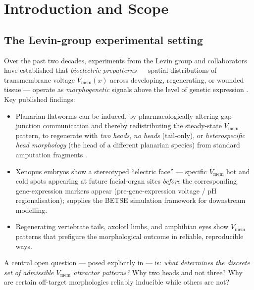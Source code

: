 \documentclass[12pt]{article}
\begin{document}
\begin{abstract}
\textbf{Status.} The spectral-structure and group-action
content is sim-verified. The identification of specific
morphological phenotypes with specific low-mode labels is
\emph{conjectural} and awaits the B\_modes\_full full-character-
projection build plus empirical comparison against curated
Levin-group regeneration outcomes. Every step is classified
as \textbf{derived} (proved / sim-verified), \textbf{identified}
(structural correspondence), or \textbf{open / conjectural}.
\end{abstract}

\section{Introduction and Scope}\label{sec:intro}

\subsection{The Levin-group experimental setting}

Over the past two decades, experiments from the Levin group and
collaborators have established that \emph{bioelectric
prepatterns} --- spatial distributions of transmembrane voltage
$V_{\mathrm{mem}}(x)$ across developing, regenerating, or
wounded tissue --- operate as \emph{morphogenetic} signals above
the level of genetic expression
\cite{LevinBeane2011,DurantLevin2017,PietakLevin2016,Levin2021}.
Key published findings:
\begin{itemize}
\item Planarian flatworms can be induced, by pharmacologically
  altering gap-junction communication and thereby redistributing
  the steady-state $V_{\mathrm{mem}}$ pattern, to regenerate with
  \emph{two heads}, \emph{no heads} (tail-only), or
  \emph{heterospecific head morphology} (the head of a different
  planarian species) from standard amputation fragments
  \cite{LevinBeane2011,EmmonsBell2015,DurantLevin2017}.
\item Xenopus embryos show a stereotyped ``electric face'' ---
  specific $V_{\mathrm{mem}}$ hot and cold spots appearing at
  future facial-organ sites \emph{before} the corresponding
  gene-expression markers appear \cite{VandenbergLevin2011}
  (pre-gene-expression voltage / pH regionalisation);
  \cite{PietakLevin2016} supplies the BETSE simulation framework
  for downstream modelling.
\item Regenerating vertebrate tails, axolotl limbs, and
  amphibian eyes show $V_{\mathrm{mem}}$ patterns that prefigure
  the morphological outcome in reliable, reproducible ways.
\end{itemize}
A central open question --- posed explicitly in
\cite{Levin2021} --- is: \emph{what determines the discrete set
of admissible $V_{\mathrm{mem}}$ attractor patterns?} Why two
heads and not three? Why are certain off-target morphologies
reliably inducible while others are not?
\end{document}
